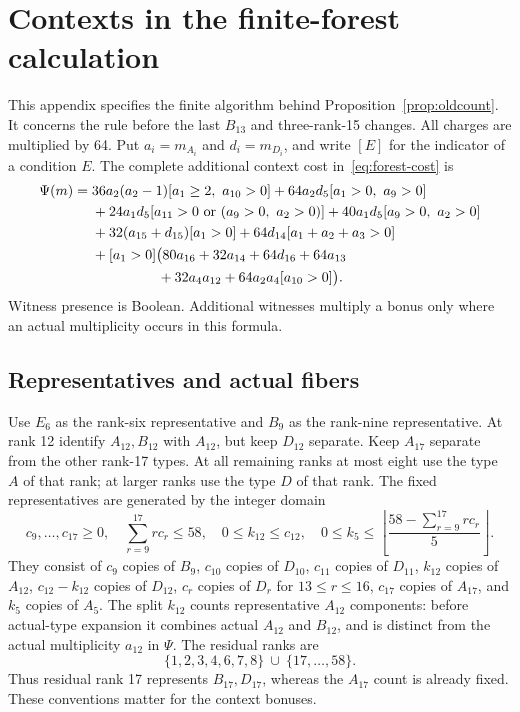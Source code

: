 \documentclass[11pt]{article}
\theoremstyle{remark}\newtheorem{remark}[theorem]{Remark}
\begin{document}
\section{Contexts in the finite-forest calculation}
\label{app:finite-contexts}

This appendix specifies the finite algorithm behind
Proposition~\ref{prop:oldcount}. It concerns the rule before the
last $B_{13}$ and three-rank-15 changes. All charges are multiplied
by 64. Put $a_i=m_{A_i}$ and $d_i=m_{D_i}$, and write $[E]$ for
the indicator of a condition $E$. The complete additional context
cost in~\eqref{eq:forest-cost} is
\begin{align*}
\Psi(m)={}&36a_2(a_2-1)[a_1\ge2,\ a_{10}>0]
       +64a_2d_5[a_1>0,\ a_9>0]\\
 &+24a_1d_5[a_{11}>0\text{ or }(a_9>0,\ a_2>0)]
       +40a_1d_5[a_9>0,\ a_2>0]\\
 &+32(a_{15}+d_{15})[a_1>0]
       +64d_{14}[a_1+a_2+a_3>0]\\
 &+[a_1>0]\bigl(80a_{16}+32a_{14}+64d_{16}+64a_{13}\\
 &\hspace{4.7em}+32a_4a_{12}+64a_2a_4[a_{10}>0]\bigr).
\end{align*}
Witness presence is Boolean. Additional witnesses multiply a bonus
only where an actual multiplicity occurs in this formula.

\subsection{Representatives and actual fibers}

Use $E_6$ as the rank-six representative and $B_9$ as the rank-nine
representative. At rank 12 identify $A_{12},B_{12}$ with $A_{12}$,
but keep $D_{12}$ separate. Keep $A_{17}$ separate from the other
rank-17 types. At all remaining ranks at most eight use the type
$A$ of that rank; at larger ranks use the type $D$ of that rank.
The fixed representatives are generated by the integer domain
\[
 c_9,\ldots,c_{17}\ge0,\quad
 \sum_{r=9}^{17}rc_r\le58,\quad
 0\le k_{12}\le c_{12},\quad
 0\le k_5\le\left\lfloor
       \frac{58-\sum_{r=9}^{17}rc_r}{5}\right\rfloor.
\]
They consist of $c_9$ copies of $B_9$, $c_{10}$ copies of $D_{10}$,
$c_{11}$ copies of $D_{11}$, $k_{12}$ copies of $A_{12}$,
$c_{12}-k_{12}$ copies of $D_{12}$, $c_r$ copies of $D_r$ for
$13\le r\le16$, $c_{17}$ copies of $A_{17}$, and $k_5$ copies
of $A_5$. The split $k_{12}$ counts representative $A_{12}$ components:
before actual-type expansion it combines actual $A_{12}$ and $B_{12}$,
and is distinct from the actual multiplicity $a_{12}$ in $\Psi$.
The residual ranks are
\[
 \{1,2,3,4,6,7,8\}\ \cup\ \{17,\ldots,58\}.
\]
Thus residual rank 17 represents $B_{17},D_{17}$, whereas the
$A_{17}$ count is already fixed. These conventions matter for
the context bonuses.
\end{document}
